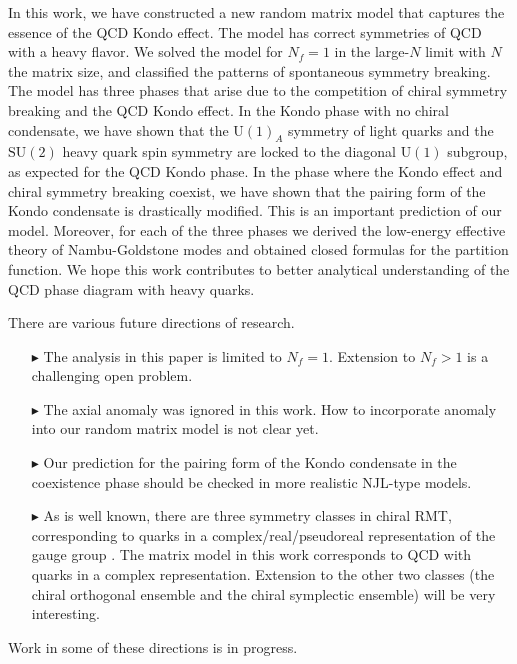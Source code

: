 \documentclass[aps,prd,longbibliography,reprint]{revtex4-2}
\newcommand{\SU}{\text{SU}}
\newcommand{\U}{\text{U}}
\newcommand{\1}{\mathbbm{1}}
\begin{document}
In this work, we have constructed a new random matrix model that captures the essence of the QCD Kondo effect. The model has correct symmetries of QCD with a heavy flavor. We solved the model for $N_f=1$ in the large-$N$ limit with $N$ the matrix size, and classified the patterns of spontaneous symmetry breaking. The model has three phases that arise due to the competition of chiral symmetry breaking and the QCD Kondo effect. In the Kondo phase with no chiral condensate, we have shown that the $\U(1)_A$ symmetry of light quarks and the $\SU(2)$ heavy quark spin symmetry are locked to the diagonal $\U(1)$ subgroup, as expected for the QCD Kondo phase. In the phase where the Kondo effect and chiral symmetry breaking coexist, we have shown that the pairing form of the Kondo condensate is drastically modified. This is an important prediction of our model. Moreover, for each of the three phases we derived the low-energy effective theory of Nambu-Goldstone modes and obtained closed formulas for the partition function. We hope this work contributes to better analytical understanding of the QCD phase diagram with heavy quarks. 

There are various future directions of research. 
\begin{itemize}
	\item[$\blacktriangleright$] The analysis in this paper is limited to $N_f=1$. Extension to $N_f>1$ is a challenging open problem.
	\item[$\blacktriangleright$] The axial anomaly was ignored in this work. How to incorporate anomaly into our random matrix model is not clear yet.
	\item[$\blacktriangleright$] Our prediction for the pairing form of the Kondo condensate in the coexistence phase should be checked in more realistic NJL-type models.
	\item[$\blacktriangleright$] As is well known, there are three symmetry classes in chiral RMT, corresponding to quarks in a complex/real/pseudoreal representation of the gauge group \cite{Verbaarschot:1994qf}. The matrix model in this work corresponds to QCD with quarks in a complex representation. Extension to the other two classes (the chiral orthogonal ensemble and the chiral symplectic ensemble) will be very interesting.
\end{itemize}

Work in some of these directions is in progress.


%
%

\end{document}
